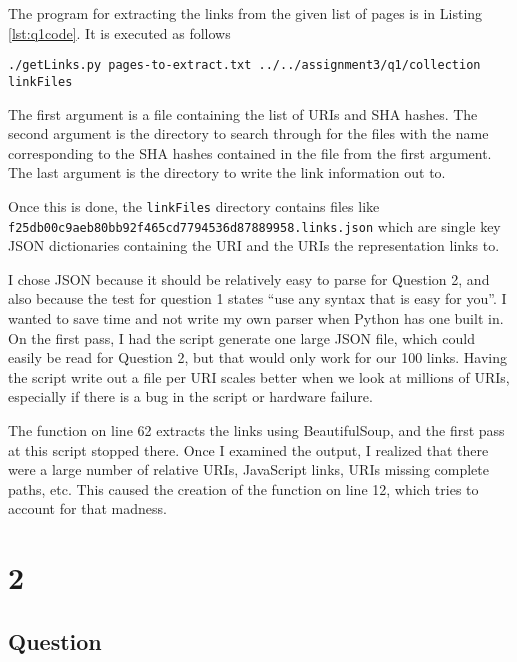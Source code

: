 \documentclass[letterpaper,11pt]{article}
\begin{document}
The program for extracting the links from the given list of pages is in Listing \ref{lst:q1code}.  It is executed as follows
\begin{lstlisting}[frame=single,basicstyle=\tiny]
./getLinks.py pages-to-extract.txt ../../assignment3/q1/collection linkFiles
\end{lstlisting}

The first argument is a file containing the list of URIs and SHA hashes.  The second argument is the directory to search through for the files with the name corresponding to the SHA hashes contained in the file from the first argument.  The last argument is the directory to write the link information out to.

Once this is done, the \verb+linkFiles+ directory contains files like \newline \verb+f25db00c9aeb80bb92f465cd7794536d87889958.links.json+ which are single key JSON dictionaries containing the URI and the URIs the representation links to.

I chose JSON because it should be relatively easy to parse for Question 2, and also because the test for question 1 states ``use any syntax that is easy for you''.  I wanted to save time and not write my own parser when Python has one built in.  On the first pass, I had the script generate one large JSON file, which could easily be read for Question 2, but that would only work for our 100 links.  Having the script write out a file per URI scales better when we look at millions of URIs, especially if there is a bug in the script or hardware failure.

The function on line 62 extracts the links using BeautifulSoup, and the first pass at this script stopped there.  Once I examined the output, I realized that there were a large number of relative URIs, JavaScript links, URIs missing complete paths, etc.  This caused the creation of the function on line 12, which tries to account for that madness.



\newpage


\newpage
\section*{2}

\subsection*{Question}
\end{document}
